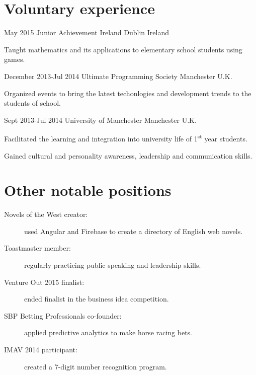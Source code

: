 \documentclass[10pt]{CurriculumVitae}
\begin{document}
  \section{Voluntary experience}
     
      {May 2015}
      {Junior Achievement Ireland}
      {Dublin}
      {Ireland}
      {
         \item Taught mathematics and its applications to elementary school students using games.
      }

      {December 2013-Jul 2014}
      {Ultimate Programming Society}
      {Manchester}
      {U.K.}
      {
         \item Organized events to bring the latest techonlogies and development trends to the students of school.
      }

      {Sept 2013-Jul 2014}
      {University of Manchester}
      {Manchester}
      {U.K.}
      {
         \item Facilitated the learning and integration into university life of 1\textsuperscript{st} year students.
         \item Gained cultural and personality awareness, leadership and communication skills.
      }


  \section{Other notable positions}
    \begin{description}
      \item[Novels of the West creator:] used Angular and Firebase to create a directory of English web novels.
      \item[Toastmaster member:] regularly practicing public speaking and leadership skills.
      \item[Venture Out 2015 finalist:] ended finalist in the business idea competition.
      \item[SBP Betting Professionals co-founder:] applied predictive analytics to make horse racing bets.
      \item[IMAV 2014 participant:] created a 7-digit number recognition program.
    \end{description}
\end{document}
